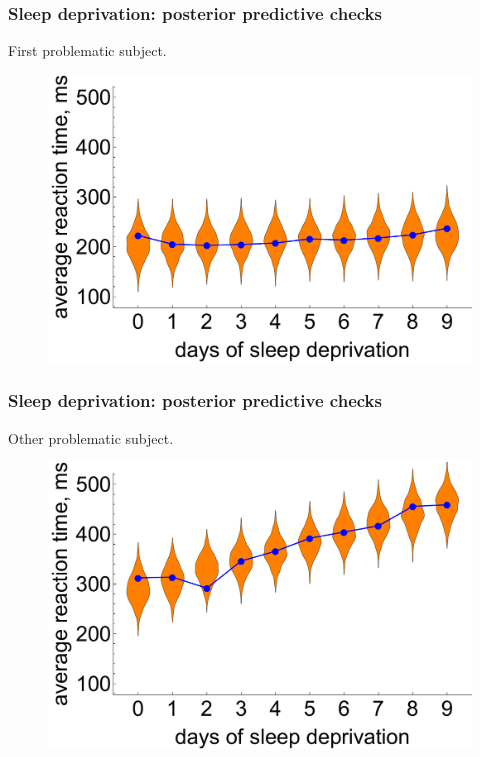 \documentclass[handout]{beamer}
\begin{document}
\begin{frame}
	\frametitle{Sleep deprivation: posterior predictive checks}
	First problematic subject.
	
	\begin{figure}[ht]
		\centerline{\includegraphics[width=1\textwidth]{./Figures/lec6_sleepPPCHeterogeneous1.pdf}}
	\end{figure}
	
\end{frame}

\begin{frame}
	\frametitle{Sleep deprivation: posterior predictive checks}
	Other problematic subject.
	
	\begin{figure}[ht]
		\centerline{\includegraphics[width=1\textwidth]{./Figures/lec6_sleepPPCHeterogeneous2.pdf}}
	\end{figure}
	
\end{frame}
\end{document}

